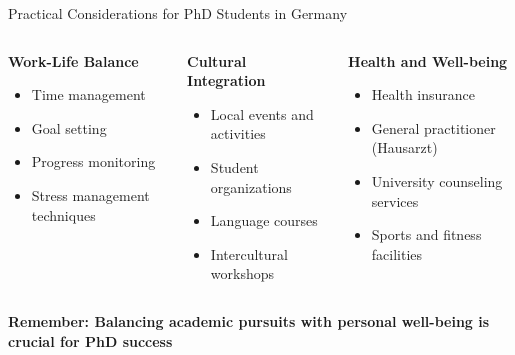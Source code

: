 \documentclass[10pt]{beamer}
\begin{document}
\begin{frame}[fragile]{Practical Considerations for PhD Students in Germany}
    \begin{columns}[T]
        \begin{column}{0.33\textwidth}
            \textbf{Work-Life Balance}
            \begin{itemize}
                \item Time management
                \item Goal setting
                \item Progress monitoring
                \item Stress management techniques
            \end{itemize}
        \end{column}
        
        \begin{column}{0.33\textwidth}
            \textbf{Cultural Integration}
            \begin{itemize}
                \item Local events and activities
                \item Student organizations
                \item Language courses
                \item Intercultural workshops
            \end{itemize}
        \end{column}
        
        \begin{column}{0.33\textwidth}
            \textbf{Health and Well-being}
            \begin{itemize}
                \item Health insurance
                \item General practitioner (Hausarzt)
                \item University counseling services
                \item Sports and fitness facilities
            \end{itemize}
        \end{column}
    \end{columns}
    
    \vspace{0.5cm}
    
    \centering\textbf{Remember: Balancing academic pursuits with personal well-being is crucial for PhD success}
\end{frame}
\end{document}
